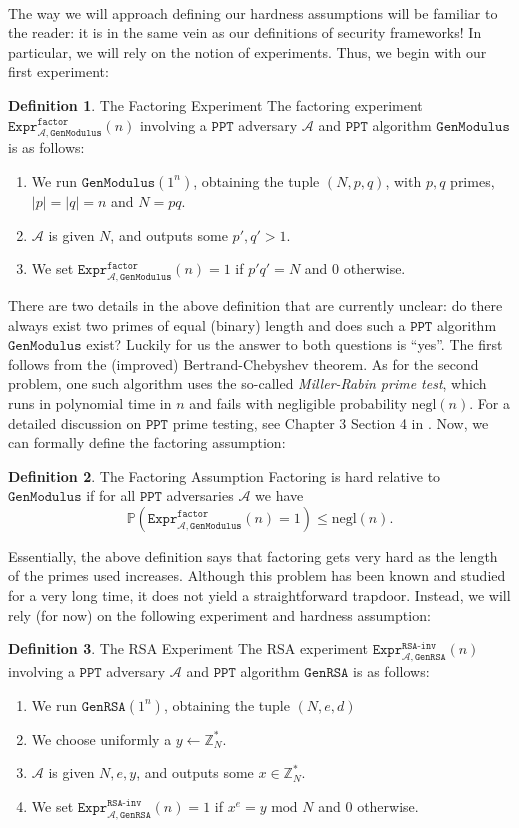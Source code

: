 \documentclass{article}
\theoremstyle{definition}
\newtheorem{definition}{Definition}[section]
\theoremstyle{example}
\newcommand{\A}{\mathcal{A}}
\newcommand{\Prob}{\mathbb{P}}
\newcommand{\Int}{\mathbb{Z}}
\newcommand{\PPT}{\texttt{PPT}}
\newcommand{\negl}{\text{negl}}
\renewcommand{\mod}{\,\,\text{mod}\,\,}
\newcommand{\Expr}[2]{\texttt{Expr}^{\texttt{#1}}_{#2}}
\newcommand{\GenModulus}{\texttt{GenModulus}}
\newcommand{\GenRSA}{\texttt{GenRSA}}
\begin{document}
\paragraph{} The way we will approach defining our hardness assumptions will be
familiar to the reader: it is in the same vein as our definitions of security
frameworks! In particular, we will rely on the notion of experiments. Thus, we
begin with our first experiment:
\begin{definition}{The Factoring Experiment} The factoring experiment
  $\Expr{factor}{\A, \GenModulus}(n)$ involving a $\PPT$ adversary $\A$ and
  $\PPT$ algorithm $\GenModulus$ is as follows:
  \begin{enumerate}
  \item We run $\GenModulus(1^n)$, obtaining the tuple $(N, p, q)$, with $p, q$
    primes, $|p| = |q| = n$ and $N = pq$.
  \item $\A$ is given $N$, and outputs some $p', q' > 1$.
  \item We set $\Expr{factor}{\A, \GenModulus}(n) = 1$ if $p'q' = N$ and $0$ otherwise.
  \end{enumerate}
\end{definition}
There are two details in the above definition that are currently unclear: do
there always exist two primes of equal (binary) length and does such a
$\PPT$ algorithm $\GenModulus$ exist? Luckily for us the answer to both
questions is ``yes''. The first follows from the (improved) Bertrand-Chebyshev
theorem. As for the second problem, one such algorithm uses the so-called
\textit{Miller-Rabin prime test}, which runs
in polynomial time in $n$ and fails with negligible probability $\negl(n)$. For
a detailed discussion on $\PPT$ prime testing, see Chapter 3 Section 4 in \cite{hoffstein2014introduction}.
Now, we can formally define the factoring assumption:
\begin{definition}{The Factoring Assumption}
  Factoring is hard relative to $\GenModulus$ if for all $\PPT$ adversaries $\A$
  we have
  \[
    \Prob(\Expr{factor}{\A, \GenModulus}(n) = 1) \leq \negl(n).
  \]
\end{definition}
Essentially, the above definition says that factoring gets very hard as the
length of the primes used increases. Although this problem has been known and
studied for a very long time, it does not yield a straightforward trapdoor.
Instead, we will rely (for now) on the following experiment and hardness assumption:
\begin{definition}{The RSA Experiment}
The RSA experiment $\Expr{RSA-inv}{\A, \GenRSA}(n)$ involving a $\PPT$ adversary $\A$ and
  $\PPT$ algorithm $\GenRSA$ is as follows:
  \begin{enumerate}
  \item We run $\GenRSA(1^n)$, obtaining the tuple $(N, e, d)$
  \item We choose uniformly a $y \leftarrow \Int_N^*$.
  \item $\A$ is given $N, e, y$, and outputs some $x \in \Int_N^*$.
  \item We set $\Expr{RSA-inv}{\A, \GenRSA}(n) = 1$ if $x^e = y \mod N$ and $0$ otherwise.
  \end{enumerate}
\end{definition}
\end{document}
